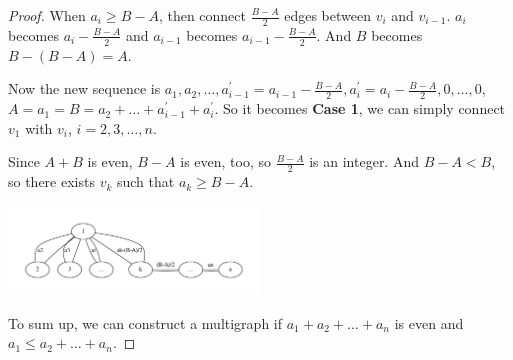 \begin{proof}
    When $a_i \geq B - A$, then connect $\frac{B-A}{2}$ edges between $v_i$ and $v_{i-1}$. $a_i$ becomes $a_i - \frac{B-A}{2}$ and $a_{i-1}$ becomes $a_{i-1} - \frac{B-A}{2}$. And $B$ becomes $B - (B-A)=A$.

    Now the new sequence is $a_1, a_2, \dots, a_{i-1}^\prime = a_{i-1} - \frac{B-A}{2}, a_i^\prime = a_i - \frac{B-A}{2}, 0, \dots, 0$, $A = a_1 = B = a_2 + \dots + a_{i-1}^\prime + a_i^\prime$. So it becomes \textbf{Case 1}, we can simply connect $v_1$ with $v_i$, $i=2,3,\dots,n$.

    Since $A+B$ is even, $B-A$ is even, too, so $\frac{B-A}{2}$ is an integer. And $B-A < B$, so there exists $v_k$ such that $a_k \geq B - A$.

\begin{center}
  \includegraphics[width=0.5\textwidth]{figures/7-2.pdf}
\end{center}

    To sum up, we can construct a multigraph if $a_1 + a_2 + \dots + a_n$ is even and $a_1 \leq a_2 + \dots + a_n$.

\end{proof}

